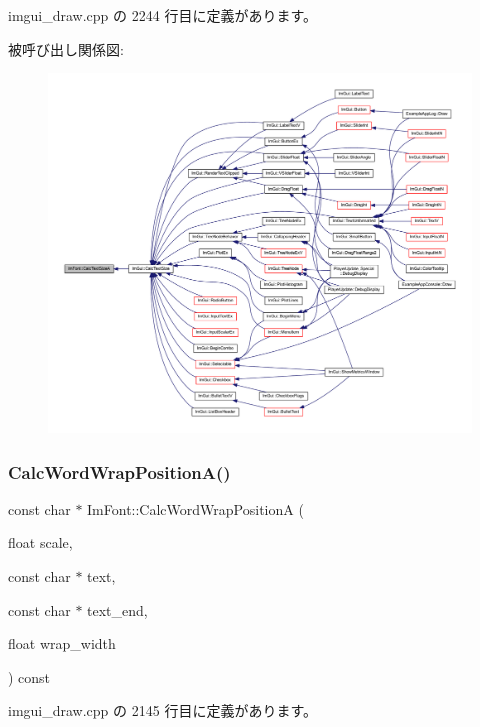  imgui\+\_\+draw.\+cpp の 2244 行目に定義があります。

被呼び出し関係図\+:\nopagebreak
\begin{figure}[H]
\begin{center}
\leavevmode
\includegraphics[width=350pt]{struct_im_font_ad67f64fd206ad197f4b93b1a1ae27cfe_icgraph}
\end{center}
\end{figure}
\mbox{\label{struct_im_font_a3781bb82a1ceba919cb6c98a398c7a67}} 
\subsubsection{\texorpdfstring{Calc\+Word\+Wrap\+Position\+A()}{CalcWordWrapPositionA()}}
{\footnotesize\ttfamily const char $\ast$ Im\+Font\+::\+Calc\+Word\+Wrap\+PositionA (\begin{DoxyParamCaption}\item[{float}]{scale,  }\item[{const char $\ast$}]{text,  }\item[{const char $\ast$}]{text\+\_\+end,  }\item[{float}]{wrap\+\_\+width }\end{DoxyParamCaption}) const}



 imgui\+\_\+draw.\+cpp の 2145 行目に定義があります。

